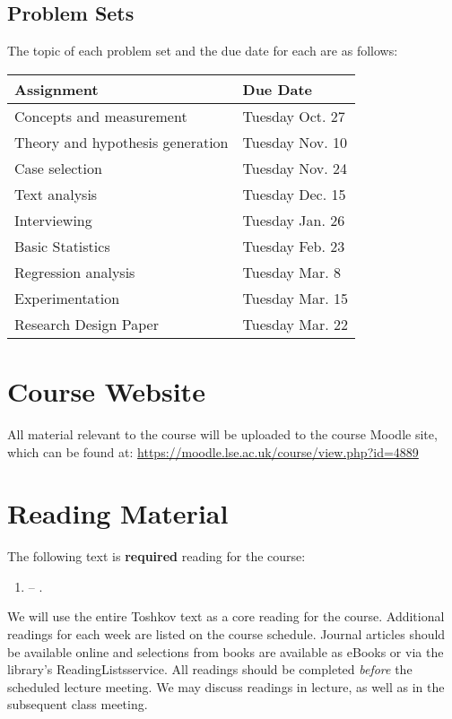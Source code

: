 \documentclass[12pt,a4paper]{article}
\newcommand{\reading}[2][]{\noindent -- {#1}\bibentry{#2}.\vspace{.25em}\\}
\begin{document}
\subsection{Problem Sets}

The topic of each problem set and the due date for each are as follows:

\begin{center}
\begin{tabular}{ll} \toprule
Assignment & Due Date \\ \midrule
Concepts and measurement & Tuesday Oct. 27 \\
Theory and hypothesis generation & Tuesday Nov. 10 \\
Case selection & Tuesday Nov. 24\\
Text analysis & Tuesday Dec. 15 \\
Interviewing & Tuesday Jan. 26\\
Basic Statistics & Tuesday Feb. 23\\
Regression analysis & Tuesday Mar. 8\\
Experimentation & Tuesday Mar. 15\\ \midrule 
Research Design Paper & Tuesday Mar. 22\\ \bottomrule
\end{tabular}
\end{center}


\section{Course Website}

All material relevant to the course will be uploaded to the course Moodle site, which can be found at: \url{https://moodle.lse.ac.uk/course/view.php?id=4889}


\section{Reading Material}

The following text is \textbf{required} reading for the course:

\begin{enumerate}
\item \reading{Toshkov2015}
\end{enumerate}

We will use the entire Toshkov text as a core reading for the course. Additional readings for each week are listed on the course schedule. Journal articles should be available online and selections from books are available as eBooks or via the library's ReadingLists\@LSE service. All readings should be completed \textit{before} the scheduled lecture meeting. We may discuss readings in lecture, as well as in the subsequent class meeting.
\end{document}
